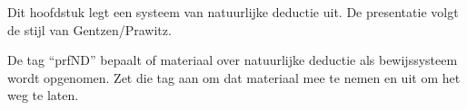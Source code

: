 \documentclass[../../../include/open-logic-chapter]{subfiles}
\begin{document}
      {}
      {}

\begin{editorial}
Dit hoofdstuk legt een systeem van natuurlijke deductie uit. De
presentatie volgt de stijl van Gentzen/Prawitz.
  
De tag ``prfND'' bepaalt of materiaal over natuurlijke deductie als
bewijssysteem wordt opgenomen. Zet die tag aan om dat materiaal mee te
nemen en uit om het weg te laten.
\end{editorial}













\OLEndChapterHook
\end{document}
